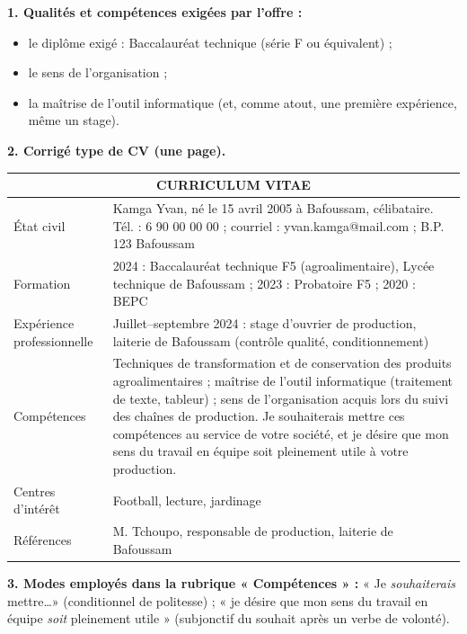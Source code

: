 \documentclass[11pt]{article}
\begin{document}
\begin{corrige}
\textbf{1. Qualités et compétences exigées par l'offre :}
\begin{itemize}
\item le diplôme exigé : Baccalauréat technique (série F ou équivalent) ;
\item le sens de l'organisation ;
\item la maîtrise de l'outil informatique (et, comme atout, une première expérience, même un stage).
\end{itemize}

\textbf{2. Corrigé type de CV (une page).}

\begin{center}
\begin{tabularx}{\linewidth}{|l|X|}
\hline
\multicolumn{2}{|c|}{\textbf{CURRICULUM VITAE}} \\
\hline
État civil & Kamga Yvan, né le 15 avril 2005 à Bafoussam, célibataire. Tél. : 6 90 00 00 00 ; courriel : yvan.kamga@mail.com ; B.P. 123 Bafoussam \\
\hline
Formation & 2024 : Baccalauréat technique F5 (agroalimentaire), Lycée technique de Bafoussam ; 2023 : Probatoire F5 ; 2020 : BEPC \\
\hline
Expérience professionnelle & Juillet–septembre 2024 : stage d'ouvrier de production, laiterie de Bafoussam (contrôle qualité, conditionnement) \\
\hline
Compétences & Techniques de transformation et de conservation des produits agroalimentaires ; maîtrise de l'outil informatique (traitement de texte, tableur) ; sens de l'organisation acquis lors du suivi des chaînes de production. Je souhaiterais mettre ces compétences au service de votre société, et je désire que mon sens du travail en équipe soit pleinement utile à votre production. \\
\hline
Centres d'intérêt & Football, lecture, jardinage \\
\hline
Références & M. Tchoupo, responsable de production, laiterie de Bafoussam \\
\hline
\end{tabularx}
\end{center}

\textbf{3. Modes employés dans la rubrique « Compétences » :} « Je \emph{souhaiterais} mettre\ldots » (conditionnel de politesse) ; « je désire que mon sens du travail en équipe \emph{soit} pleinement utile » (subjonctif du souhait après un verbe de volonté).


\end{corrige}
\end{document}
